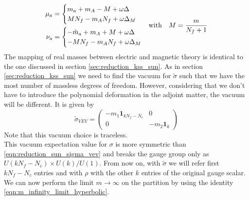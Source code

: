 \begin{equation}
\begin{aligned}
	\mu_a &  = \begin{cases}
	m_a + m_A - M + \omega \Delta \\
	M N_f - m_A N_f + \omega \Delta_M\\
	\end{cases}
	\\
 \nu_a & =   \begin{cases}
	- \tilde{m}_a + m_A + M + \omega \Delta \\
	- M N_f - m_A N_f + \omega \Delta_M \\
	\end{cases}
\end{aligned}
\\
\hbox{with} \quad M =  \frac{m}{N_f +1}
\end{equation}
The mapping of real masses between electric and magnetic theory is identical to the one discussed in section \ref{sec:reduction_kss_sun}.
As in section \ref{sec:reduction_kss_sun} we need to find the vacuum for $\tilde{\sigma}$ such that we have the most number of massless degrees of freedom.
However, considering that we don't have to introduce the polynomial deformation in the adjoint matter, the vacuum will be different. It is given by
\begin{equation}
 \tilde{\sigma}_{VEV} =
 \begin{pmatrix}
	- m_1 \mathbf{ 1}_{ k N_f - N_c} & 0 \\
	0 &  - m_2 \mathbf{ 1}_{k}
 \end{pmatrix}
\end{equation}
Note that this vacuum choice is traceless.\\
This vacuum expectation value for $\sigma$ is more symmetric than \eqref{eqn:reduction_sun_sigma_vev} and breaks the gauge group only as $U(k N_f - N_c) \times U(k) / U(1)$.
From now on, with $\tilde{\sigma}$ we will refer first $k N_f - N_c$ entries and with $\rho$ with the other $k$ entries of the original gauge scalar.
\\
We can now perform the limit $m \rightarrow \infty$ on the partition by using the identity \eqref{eqn:m_infinity_limit_hyperbolic}.


